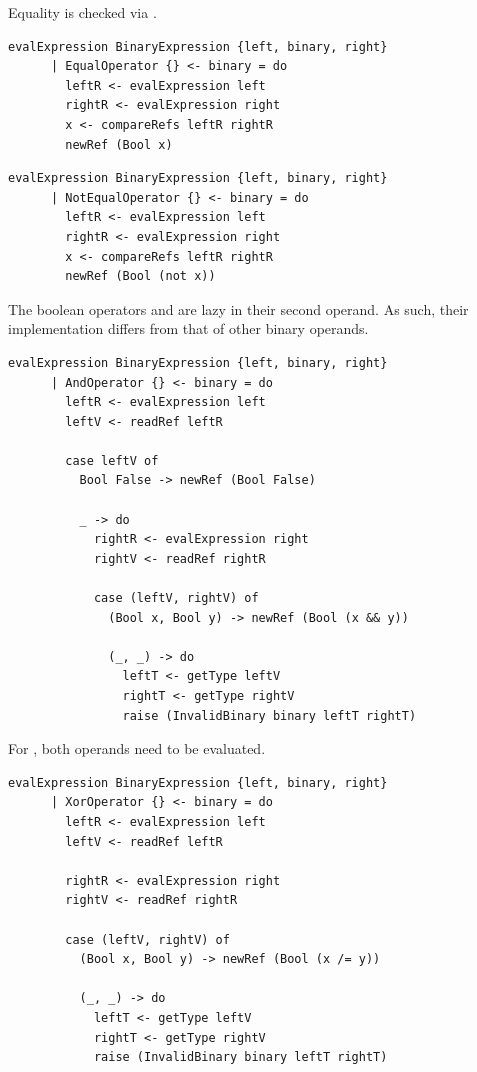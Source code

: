 \documentclass[UdineBachThesis,american,11pt,draft]{PhdThesis}
\begin{document}
  Equality is checked via \lstinline@compareRefs@.

  \begin{lstlisting}[gobble=4,basicstyle=\ttfamily\small]
    evalExpression BinaryExpression {left, binary, right}
      | EqualOperator {} <- binary = do
        leftR <- evalExpression left
        rightR <- evalExpression right
        x <- compareRefs leftR rightR
        newRef (Bool x)
  \end{lstlisting}

  \begin{lstlisting}[gobble=4,basicstyle=\ttfamily\small]
    evalExpression BinaryExpression {left, binary, right}
      | NotEqualOperator {} <- binary = do
        leftR <- evalExpression left
        rightR <- evalExpression right
        x <- compareRefs leftR rightR
        newRef (Bool (not x))
  \end{lstlisting}

  The boolean operators \lstinline@and@ and \lstinline@or@ are lazy in their
  second operand. As such, their implementation differs from that of other
  binary operands.

  \begin{lstlisting}[gobble=4,basicstyle=\ttfamily\small]
    evalExpression BinaryExpression {left, binary, right}
      | AndOperator {} <- binary = do
        leftR <- evalExpression left
        leftV <- readRef leftR

        case leftV of
          Bool False -> newRef (Bool False)

          _ -> do
            rightR <- evalExpression right
            rightV <- readRef rightR

            case (leftV, rightV) of
              (Bool x, Bool y) -> newRef (Bool (x && y))

              (_, _) -> do
                leftT <- getType leftV
                rightT <- getType rightV
                raise (InvalidBinary binary leftT rightT)
  \end{lstlisting}

  For \lstinline@xor@, both operands need to be evaluated.

  \begin{lstlisting}[gobble=4,basicstyle=\ttfamily\small]
    evalExpression BinaryExpression {left, binary, right}
      | XorOperator {} <- binary = do
        leftR <- evalExpression left
        leftV <- readRef leftR

        rightR <- evalExpression right
        rightV <- readRef rightR

        case (leftV, rightV) of
          (Bool x, Bool y) -> newRef (Bool (x /= y))

          (_, _) -> do
            leftT <- getType leftV
            rightT <- getType rightV
            raise (InvalidBinary binary leftT rightT)
  \end{lstlisting}
\end{document}
